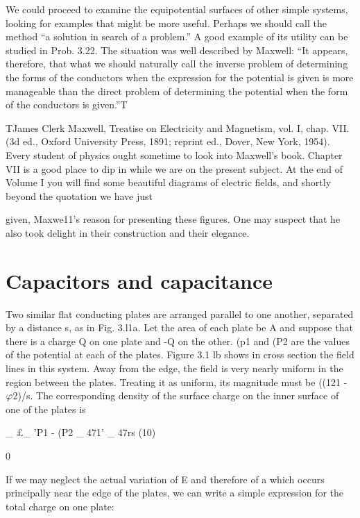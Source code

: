 We could proceed to examine the equipotential surfaces of other
simple systems, looking for examples that might be more useful.
Perhaps we should call the method ``a solution in search of a
problem.'' A good example of its utility can be studied in Prob. 3.22.
The situation was well described by Maxwell: ``It appears, therefore,
that what we should naturally call the inverse problem of determining
the forms of the conductors when the expression for the potential
is given is more manageable than the direct problem of determining
the potential when the form of the conductors is given.''T

TJames Clerk Maxwell, Treatise on Electricity and Magnetism, vol. I, chap. VII.
(3d ed., Oxford University Press, 1891; reprint ed., Dover, New York, 1954). Every
student of physics ought sometime to look into Maxwell's book. Chapter VII is a good
place to dip in while we are on the present subject. At the end of Volume I you will find
some beautiful diagrams of electric fields, and shortly beyond the quotation we have just

given, Maxwe11's reason for presenting these figures. One may suspect that he also took
delight in their construction and their elegance.

\section{Capacitors and capacitance}

Two similar flat conducting plates are arranged parallel to one
another, separated by a distance s, as in Fig. 3.l1a. Let the area of
each plate be A and suppose that there is a charge Q on one plate
and -Q on the other. (p1 and (P2 are the values of the potential at
each of the plates. Figure 3.1 lb shows in cross section the field lines
in this system. Away from the edge, the field is very nearly uniform
in the region between the plates. Treating it as uniform, its magnitude
must be ((121 - $\varphi$2)/s. The corresponding density of the surface
charge on the inner surface of one of the plates is

_ £_ 'P1 - (P2
_ 471' _ 47rs (10)

0

 

If we may neglect the actual variation of E and therefore of a which
occurs principally near the edge of the plates, we can write a simple
expression for the total charge on one plate:



